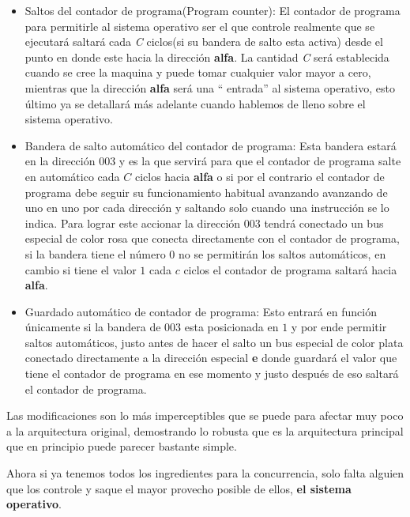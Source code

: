 \documentclass[12pt]{article}
\begin{document}
	\begin{itemize}
		\item Saltos del contador de programa(Program counter):  
			El contador de programa para permitirle al sistema operativo ser el que controle realmente que se ejecutará saltará
			cada \textit{C} ciclos(si su bandera de salto esta activa) desde el punto en donde este hacia la dirección \textbf{alfa}.
			La cantidad \textit{C} será establecida cuando se cree la maquina y puede tomar cualquier valor mayor a cero, mientras
			que la dirección \textbf{alfa} será una `` entrada'' al sistema operativo, esto último ya se detallará más adelante
			cuando hablemos de lleno sobre el sistema operativo.
		
		\item Bandera de salto automático del contador de programa: 
			Esta bandera estará en la dirección $003$ y es la que servirá para que el contador de programa salte en automático cada $C$
			ciclos hacia \textbf{alfa} o si por el contrario el contador de programa debe seguir su funcionamiento habitual avanzando
			avanzando de uno en uno por cada dirección y saltando solo cuando una instrucción se lo indica. Para lograr este accionar
			la dirección $003$ tendrá conectado un bus especial de color rosa que conecta directamente con el contador de programa, si
			la bandera tiene el número $0$ no se permitirán los saltos automáticos, en cambio si tiene el valor $1$ cada $c$ ciclos el
			contador de programa saltará hacia \textbf{alfa}.
			
		\item Guardado automático de contador de programa:
			Esto entrará en función únicamente si la bandera de $003$ esta posicionada en $1$ y por ende permitir saltos automáticos,
			justo antes de hacer el salto un bus especial de color plata conectado directamente a la dirección especial \textbf{e} donde
			guardará el valor que tiene el contador de programa en ese momento y justo después de eso saltará el contador de programa.
			
	\end{itemize}
	
	Las modificaciones son lo más imperceptibles que se puede para afectar muy poco a la arquitectura original, demostrando
	lo robusta que es la arquitectura principal que en principio puede parecer bastante simple.
	
	Ahora si ya tenemos todos los ingredientes para la concurrencia, solo falta alguien que los controle y saque el mayor provecho
	posible de ellos, \textbf{el sistema operativo}.
	
\end{document}
